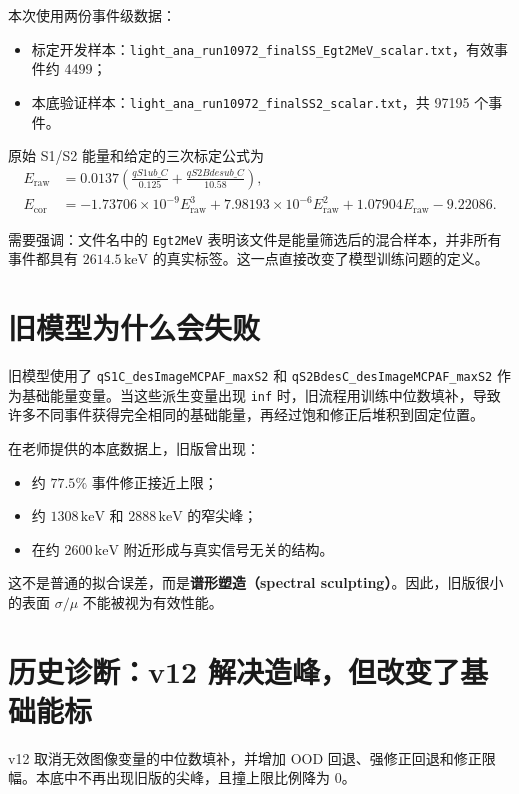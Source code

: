 \documentclass[UTF8,11pt,a4paper]{ctexart}
\begin{document}
本次使用两份事件级数据：
\begin{itemize}
  \item 标定开发样本：\texttt{light\_ana\_run10972\_finalSS\_Egt2MeV\_scalar.txt}，有效事件约 4499；
  \item 本底验证样本：\texttt{light\_ana\_run10972\_finalSS2\_scalar.txt}，共 97195 个事件。
\end{itemize}

原始 S1/S2 能量和给定的三次标定公式为
\begin{align}
E_{\mathrm{raw}} &= 0.0137\left(\frac{qS1ub\_C}{0.125}+\frac{qS2Bdesub\_C}{10.58}\right),\\
E_{\mathrm{cor}} &= -1.73706\times10^{-9}E_{\mathrm{raw}}^3
 +7.98193\times10^{-6}E_{\mathrm{raw}}^2
 +1.07904E_{\mathrm{raw}}-9.22086.
\end{align}

需要强调：文件名中的 \texttt{Egt2MeV} 表明该文件是能量筛选后的混合样本，并非所有事件都具有 $2614.5\,\mathrm{keV}$ 的真实标签。这一点直接改变了模型训练问题的定义。

\clearpage
\section{旧模型为什么会失败}

旧模型使用了
\texttt{qS1C\_desImageMCPAF\_maxS2} 和
\texttt{qS2BdesC\_desImageMCPAF\_maxS2} 作为基础能量变量。当这些派生变量出现 \texttt{inf} 时，旧流程用训练中位数填补，导致许多不同事件获得完全相同的基础能量，再经过饱和修正后堆积到固定位置。

在老师提供的本底数据上，旧版曾出现：
\begin{itemize}
  \item 约 $77.5\%$ 事件修正接近上限；
  \item 约 $1308\,\mathrm{keV}$ 和 $2888\,\mathrm{keV}$ 的窄尖峰；
  \item 在约 $2600\,\mathrm{keV}$ 附近形成与真实信号无关的结构。
\end{itemize}

这不是普通的拟合误差，而是\textbf{谱形塑造（spectral sculpting）}。因此，旧版很小的表面 $\sigma/\mu$ 不能被视为有效性能。

\section{历史诊断：v12 解决造峰，但改变了基础能标}

v12 取消无效图像变量的中位数填补，并增加 OOD 回退、强修正回退和修正限幅。本底中不再出现旧版的尖峰，且撞上限比例降为 0。
\end{document}
